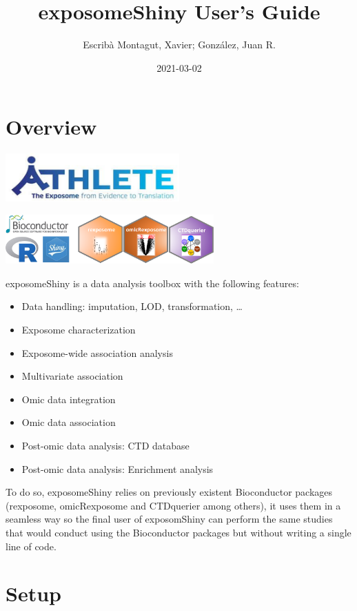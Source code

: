 \documentclass[
]{book}
\title{exposomeShiny User's Guide}
\author{Escribà Montagut, Xavier; González, Juan R.}
\date{2021-03-02}
\providecommand{\tightlist}{%
  \setlength{\itemsep}{0pt}\setlength{\parskip}{0pt}}
\begin{document}
\maketitle

{
\setcounter{tocdepth}{1}
\tableofcontents
}
\hypertarget{overview}{%
\chapter{Overview}\label{overview}}

\includegraphics[width=0.5\textwidth,height=\textheight]{images/athlete.png}

\includegraphics[width=0.6\textwidth,height=\textheight]{images/logo.png}

exposomeShiny is a data analysis toolbox with the following features:

\begin{itemize}
\tightlist
\item
  Data handling: imputation, LOD, transformation, \ldots{}
\item
  Exposome characterization
\item
  Exposome-wide association analysis
\item
  Multivariate association
\item
  Omic data integration
\item
  Omic data association
\item
  Post-omic data analysis: CTD database
\item
  Post-omic data analysis: Enrichment analysis
\end{itemize}

To do so, exposomeShiny relies on previously existent Bioconductor packages (rexposome, omicRexposome and CTDquerier among others), it uses them in a seamless way so the final user of exposomShiny can perform the same studies that would conduct using the Bioconductor packages but without writing a single line of code.

\hypertarget{setup}{%
\chapter{Setup}\label{setup}}
\end{document}
